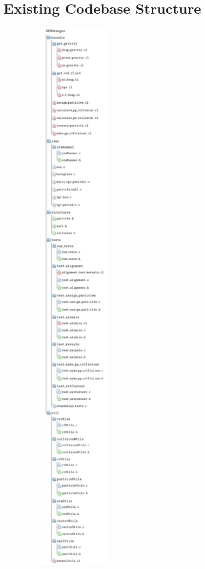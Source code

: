 \documentclass[../Interim_Report_Master]{subfiles}
\begin{document}
\newpage
\section{Existing Codebase Structure}\label{prog_strut}
\begin{figure}
	\centering
	\includegraphics*[width=0.5\textwidth, trim=0 900 0 0, clip]{./Diagrams/DEMOranges_Structure/DEMOranges_Structure.pdf}
\end{figure}
\end{document}
